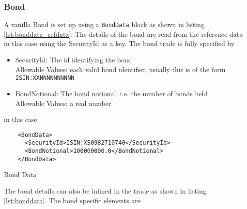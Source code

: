 \subsubsection{Bond}
\label{ss:bond}

A vanilla Bond is set up using a {\tt BondData} block as shown in listing \ref{lst:bonddata_refdata}. The details of the
bond are read from the reference data in this case using the SecurityId as a key. The bond trade is fully specified by

\begin{itemize}
\item SecurityId: The id identifying the bond\\
  Allowable Values: each valid bond identifier, usually this is of the form \verb+ISIN:XXNNNNNNNNNN+
\item BondNotional: The bond notional, i.e. the number of bonds held\\
  Allowable Values: a real number
\end{itemize}

in this case.

\begin{listing}[H]
\begin{verbatim}
    <BondData>
      <SecurityId>ISIN:XS0982710740</SecurityId>
      <BondNotional>100000000.0</BondNotional>
    </BondData>
\end{verbatim}
\caption{Bond Data}
\label{lst:bonddata_refdata}
\end{listing}

The bond details can also be inlined in the trade as shown in listing \ref{lst:bonddata}. The bond specific elements are

